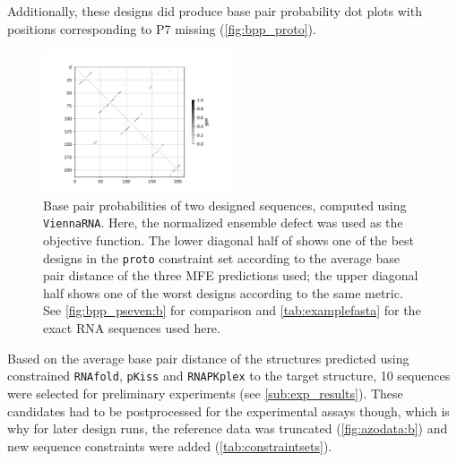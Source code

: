 \documentclass[../../master.tex]{subfiles}
\begin{document}
Additionally, these designs did produce base pair probability dot plots with positions corresponding to P7 missing (\autoref{fig:bpp_proto}).

\begin{figure}[!ht]
	\centering
	\includegraphics[trim=50 10 50 10, clip, width=0.5\textwidth]{pic/results/designs/dotplots/examples/proto-range.pdf}
	\caption[Base Pair Probabilities of Initial Constrained Designs]{
		Base pair probabilities of two designed sequences, computed using \texttt{ViennaRNA}. Here, the normalized ensemble defect was used as the objective function.
		The lower diagonal half of shows one of the best designs in the \texttt{proto} constraint set according to the average base pair distance of the three MFE predictions used; the upper diagonal half shows one of the worst designs according to the same metric. See \autoref{fig:bpp_pseven:b} for comparison and \autoref{tab:examplefasta} for the exact RNA sequences used here.
	}\label{fig:bpp_proto}
\end{figure}
Based on the average base pair distance of the structures predicted using constrained \texttt{RNAfold}, \texttt{pKiss} and \texttt{RNAPKplex} to the target structure, 10 sequences were selected for preliminary experiments (see \autoref{sub:exp_results}).
These candidates had to be postprocessed for the experimental assays though, which is why for later design runs, the reference data was truncated (\autoref{fig:azodata:b}) and new sequence constraints were added (\autoref{tab:constraintsets}).
\end{document}
